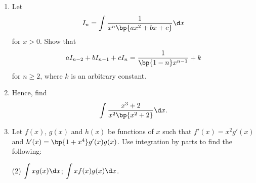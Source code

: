 \begin{problem}
    \begin{enumerate}
        \item Let \[I_n = \int \frac1{x^n \bp{ax^2 + bx + c}} \d x\] for $x > 0$. Show that \[aI_{n-2} + bI_{n-1} + cI_n = \frac1{\bp{1-n} x^{n-1}} + k\] for $n \geq 2$, where $k$ is an arbitrary constant.
        \item Hence, find \[\int \frac{x^3 + 2}{x^2 \bp{x^2 + 2}} \d x.\]
        \item Let $f(x)$, $g(x)$ and $h(x)$ be functions of $x$ such that $f'(x) = x^2 g'(x)$ and $h'(x) = \bp{1 + x^4} g'(x) g(x)$. Use integration by parts to find the following:
        \begin{tasks}[label=(\roman*)](2)
            \task $\displaystyle\int xg(x) \d x$;
            \task $\displaystyle\int xf(x)g(x) \d x$.
        \end{tasks}
    \end{enumerate}
\end{problem}
